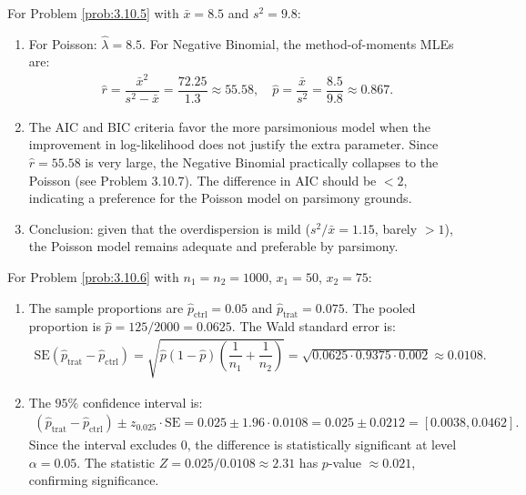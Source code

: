 \begin{solucion}
	\label{sol:3.10.5}
	For Problem \ref{prob:3.10.5} with $\bar{x} = 8.5$ and $s^{2} = 9.8$:
	\begin{enumerate}
		\item For Poisson: $\hat{\lambda} = 8.5$. For Negative Binomial, the method-of-moments MLEs are:
		\begin{align*}
			\hat{r} = \dfrac{\bar{x}^{2}}{s^{2} - \bar{x}} = \dfrac{72.25}{1.3} \approx 55.58, \quad \hat{p} = \dfrac{\bar{x}}{s^{2}} = \dfrac{8.5}{9.8} \approx 0.867.
		\end{align*}
		\item The AIC and BIC criteria favor the more parsimonious model when the improvement in log-likelihood does not justify the extra parameter. Since $\hat{r} = 55.58$ is very large, the Negative Binomial practically collapses to the Poisson (see Problem 3.10.7). The difference in AIC should be $< 2$, indicating a preference for the Poisson model on parsimony grounds.
		\item Conclusion: given that the overdispersion is mild ($s^{2}/\bar{x} = 1.15$, barely $> 1$), the Poisson model remains adequate and preferable by parsimony.
	\end{enumerate}
\end{solucion}

\begin{solucion}
	\label{sol:3.10.6}
	For Problem \ref{prob:3.10.6} with $n_{1} = n_{2} = 1000$, $x_{1} = 50$, $x_{2} = 75$:
	\begin{enumerate}
		\item The sample proportions are $\hat{p}_{\text{ctrl}} = 0.05$ and $\hat{p}_{\text{trat}} = 0.075$. The pooled proportion is $\hat{p} = 125/2000 = 0.0625$. The Wald standard error is:
		\begin{align*}
			\text{SE}(\hat{p}_{\text{trat}} - \hat{p}_{\text{ctrl}}) = \sqrt{\hat{p}(1-\hat{p})\left(\dfrac{1}{n_{1}} + \dfrac{1}{n_{2}}\right)} = \sqrt{0.0625 \cdot 0.9375 \cdot 0.002} \approx 0.0108.
		\end{align*}
		\item The $95\%$ confidence interval is:
		\begin{align*}
			(\hat{p}_{\text{trat}} - \hat{p}_{\text{ctrl}}) \pm z_{0.025} \cdot \text{SE} = 0.025 \pm 1.96 \cdot 0.0108 = 0.025 \pm 0.0212 = [0.0038, 0.0462].
		\end{align*}
		Since the interval excludes $0$, the difference is statistically significant at level $\alpha = 0.05$. The statistic $Z = 0.025/0.0108 \approx 2.31$ has $p$-value $\approx 0.021$, confirming significance.
	\end{enumerate}
\end{solucion}


